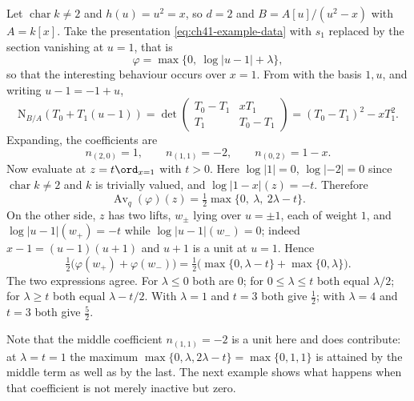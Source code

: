 \begin{example}
\label{ex:ch41-separable-average}
Let $\operatorname{char}k\ne2$ and $h(u)=u^2=x$, so $d=2$ and
$B=A[u]/(u^2-x)$ with $A=k[x]$.  Take the presentation
\eqref{eq:ch41-example-data} with $s_1$ replaced by the section vanishing
at $u=1$, that is
\[
 \varphi=\max\{0,\ \log|u-1|+\lambda\},
\]
so that the interesting behaviour occurs over $x=1$.  From
 with the basis $1,u$, and writing
$u-1=-1+u$,
\[
 \mathrm N_{B/A}(T_0+T_1(u-1))
 =\det\begin{pmatrix}T_0-T_1&xT_1\\ T_1&T_0-T_1\end{pmatrix}
 =(T_0-T_1)^2-xT_1^2 .
\]
Expanding, the coefficients are
\[
 n_{(2,0)}=1,\qquad n_{(1,1)}=-2,\qquad n_{(0,2)}=1-x .
\]
Now evaluate at $z=t\ord_{x=1}$ with $t>0$.  Here
$\log|1|=0$, $\log|-2|=0$ since $\operatorname{char}k\ne2$ and $k$
is trivially valued, and $\log|1-x|(z)=-t$.  Therefore
\[
 \operatorname{Av}_q(\varphi)(z)
 =\tfrac12\max\{0,\ \lambda,\ 2\lambda-t\}.
\]
On the other side, $z$ has two lifts, $w_\pm$ lying over $u=\pm1$,
each of weight $1$, and $\log|u-1|(w_+)=-t$ while
$\log|u-1|(w_-)=0$; indeed $x-1=(u-1)(u+1)$ and $u+1$ is a unit at
$u=1$.  Hence
\[
 \tfrac12\bigl(\varphi(w_+)+\varphi(w_-)\bigr)
 =\tfrac12\bigl(\max\{0,\lambda-t\}+\max\{0,\lambda\}\bigr).
\]
The two expressions agree.  For $\lambda\le0$ both are $0$; for
$0\le\lambda\le t$ both equal $\lambda/2$; for $\lambda\ge t$ both
equal $\lambda-t/2$.  With $\lambda=1$ and $t=3$ both give
$\tfrac12$; with $\lambda=4$ and $t=3$ both give $\tfrac52$.

Note that the middle coefficient $n_{(1,1)}=-2$ is a unit here and does
contribute: at $\lambda=t=1$ the maximum
$\max\{0,\lambda,2\lambda-t\}=\max\{0,1,1\}$ is attained by the middle
term as well as by the last.  The next example shows what happens when that
coefficient is not merely inactive but zero.
\end{example}

